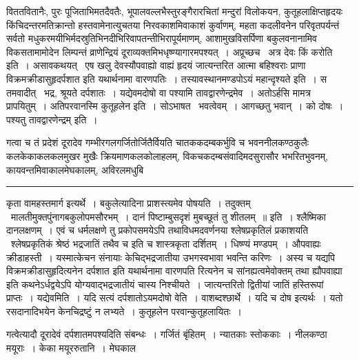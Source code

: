 \documentclass[11pt, openany]{book}
\begin{document}
\newpage

\noindent
विततवितानैः, पुरः पूजिताभिमतदैवतैः, भूपालवल्लभैस्तुरङ्गैरारचितां मन्दुरां विलोकयन, कुतूहलाक्षिप्तहृदयः किंचिदन्तरमतिक्रान्तो हस्तवामेनात्युचतया निरवकाशमिवाकाशं कुर्वाणम्, महता कदलीवनेन परिवृतपर्यन्तं सर्वतो मधुकरमयीभिर्मदस्रुतिभिनदीभिरिवापतन्तीभिरापूर्यमाणम्, आशामुखविसर्पिणा बकुलवनानामिव विकसतामामोदेन लिम्पन्तं व्राणेन्द्रियं दूराव्यक्तमिभधृष्ण्यागारमपश्यत्~। अप्रूच्छच \textendash\ {\qtt अत्र देवः किं करोति} इति~। असावकथयत् \textendash\ एष खलु देवस्यौपवाह्यो वाह्यं हृदयं जात्यन्तरित आत्मा बहिश्वराः प्राणा विक्रमक्रीडासुहृदर्पशात इति यथार्थनामा वारणपतिः~। तस्यावस्थानमण्डपोऽयं महान्दृश्यते इति~। स तमवादीत् \textendash\ {\haq भद्र, श्रूयते दर्पशातः~। यद्येवमदोषो वा पश्यामि तावद्वारणेन्द्रमेव~। अतोऽर्हसि मामत्र प्रापयितुम्~। अतिपरवानस्मि कुतूहलेन} इति~। सोऽभाषत \textendash\ {\haq भवत्वेवम्~। आगच्छतु भवान्~। को दोषः~। पश्यतु तावद्वारणेन्द्रम्} इति~।

गत्वा च तं प्रदेशं दूरादेव गम्भीरगलगर्जितोर्जितैर्वियति चातककदम्बकर्भुवि च भवननीलकण्ठकुलैः कलकेकाकलकलमुखर मुखैः क्रियमाणकलकोलाहलम्, विकचकदम्बसंवादिमदसुरासौर भभरितभुवनम्, कायवन्तमिवाकालमेघकालम्, अविरलमधुबि\textendash

\vspace{2mm}
\hrule

\noindent
{\s कृता वामहस्तमार्ग इत्यर्थे~। बकुलेत्यादिना प्राशस्त्यमेव पोषयति~। तदुक्तम् \textendash\ {\qt मालतीमुक्तपुंनागबकुलोपमसौरभम्~। दानं पिष्टाम्बुसदृशं मुबच्छूतं तु शीतलम्~॥} इति~। श्लैष्मिका दानलक्षणम्~। एवं च धर्मलक्षणे तु प्रकोपसमयेऽपि तथाविधमदवर्णनया श्लेषप्रकृतिलं प्रकाशयति \textendash\ {\qt श्लेषप्रकृतिकं श्रेष्ठं भद्रजातिं तथैव च} इति च शास्त्रकृता दर्शितम्~। धिष्ण्यं मण्डपम्~। औपवाह्यः क्रीडाहस्ती~। यस्मात्केचन संनायाः केचिद्भद्रजातीया उभगस्वभावा भवन्ति करिणः~। अस्य च यद्यपि विक्रमक्रीडासुहृदित्यनेन दर्पशात इति यथार्थनामा वारणपति रित्यनेन च सांनह्यत्वमेवोक्तम् तथा ह्यौपवाह्या इति कथनेऽर्धद्वयेऽपि योग्यवाद्भद्रजातीयं चास्य निश्चीयते~। जात्यन्तरितो द्वितीयां जातिं हस्तिरूपां प्राप्तः~। {\qtt यद्येवमिति}~। यदि सत्यं दर्पशातोऽयमदोषो वेति~। वाशब्दश्छार्थे~। यदि च दोष इत्यर्थः~। यतो रसदानादिभयेन केनचिद्रष्टुं न लभ्यते~। कुतूहलेन परवान्कुतूहलायितः~।

गत्वेत्यादौ दूरादेवं दर्पशातमपश्यदिति संबन्धः~। गर्जितं बृंहितम्~। न्यातकाः स्तोककाः~। नीलकण्ठा मयूराः~। केका मयूररुतानि~। {\qtt मेघकाल\textendash}}

\newpage
\end{document}
